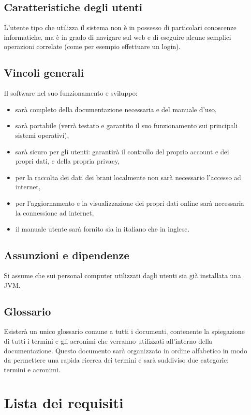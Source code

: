 \section{Caratteristiche degli utenti}
L'utente tipo che utilizza il sistema non \`e in possesso di particolari
conoscenze informatiche, ma \`e in grado di navigare sul web e di eseguire alcune
semplici operazioni correlate (come per esempio effettuare un login).
\section{Vincoli generali}
Il software nel suo funzionamento e sviluppo:
\begin{itemize}
  \item sar\`a completo della documentazione necessaria e del manuale d'uso,
  \item sar\`a portabile (verr\`a testato e garantito il suo funzionamento sui
  principali sistemi operativi),
  \item sar\`a sicuro per gli utenti: garantir\`a il controllo del proprio account e
  dei propri dati, e della propria privacy,
  \item per la raccolta dei dati dei brani localmente non sar\`a necessario
  l'accesso ad internet,
  \item per l'aggiornamento e la visualizzazione dei propri dati online sar\`a
  necessaria la connessione ad internet,
  \item il manuale utente sar\`a fornito sia in italiano che in inglese.
\end{itemize}
\section{Assunzioni e dipendenze}
Si assume che sui personal computer utilizzati dagli utenti sia gi\`a installata
una JVM.
\section{Glossario}
Esister\`a un unico glossario comune a tutti i documenti, contenente la
spiegazione di tutti i termini e gli acronimi che verranno utilizzati
all'interno della documentazione. Questo documento sar\`a organizzato in ordine
alfabetico in modo da permettere una rapida ricerca dei termini e sar\`a suddiviso
due categorie: termini e acronimi.

\chapter{Lista dei requisiti}
\thispagestyle{fancy}
